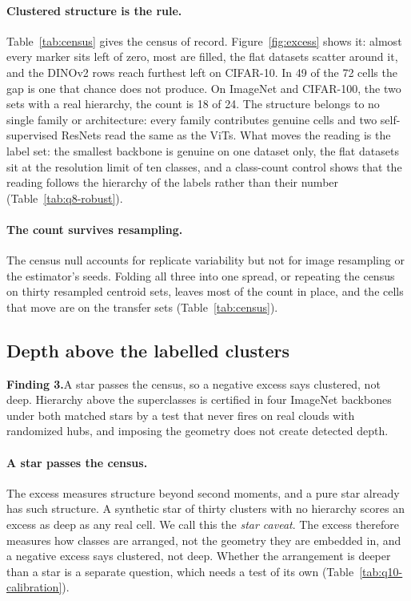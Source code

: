 \documentclass{article}
\theoremstyle{definition}
\begin{document}
\paragraph{Clustered structure is the rule.} Table~\ref{tab:census} gives the census of record. Figure~\ref{fig:excess} shows it: almost every marker sits left of zero, most are filled, the flat datasets scatter around it, and the DINOv2 rows reach furthest left on CIFAR-10. In 49 of the 72 cells the gap is one that chance does not produce. On ImageNet and CIFAR-100, the two sets with a real hierarchy, the count is 18 of 24. The structure belongs to no single family or architecture: every family contributes genuine cells and two self-supervised ResNets read the same as the ViTs. What moves the reading is the label set: the smallest backbone is genuine on one dataset only, the flat datasets sit at the resolution limit of ten classes, and a class-count control shows that the reading follows the hierarchy of the labels rather than their number (Table~\ref{tab:q8-robust}). %

\paragraph{The count survives resampling.} The census null accounts for replicate variability but not for image resampling or the estimator's seeds. Folding all three into one spread, or repeating the census on thirty resampled centroid sets, leaves most of the count in place, and the cells that move are on the transfer sets (Table~\ref{tab:census}). %

\subsection{Depth above the labelled clusters}
\label{sec:v2-depthresults}

\begin{shaded}
\textbf{Finding 3.}\quad A star passes the census, so a negative excess says clustered, not deep. Hierarchy above the superclasses is certified in four ImageNet backbones under both matched stars by a test that never fires on real clouds with randomized hubs, and imposing the geometry does not create detected depth.
\end{shaded}

\paragraph{A star passes the census.} The excess measures structure beyond second moments, and a pure star already has such structure. A synthetic star of thirty clusters with no hierarchy scores an excess as deep as any real cell. We call this the \emph{star caveat}. The excess therefore measures how classes are arranged, not the geometry they are embedded in, and a negative excess says clustered, not deep. Whether the arrangement is deeper than a star is a separate question, which needs a test of its own (Table~\ref{tab:q10-calibration}). %
\end{document}
